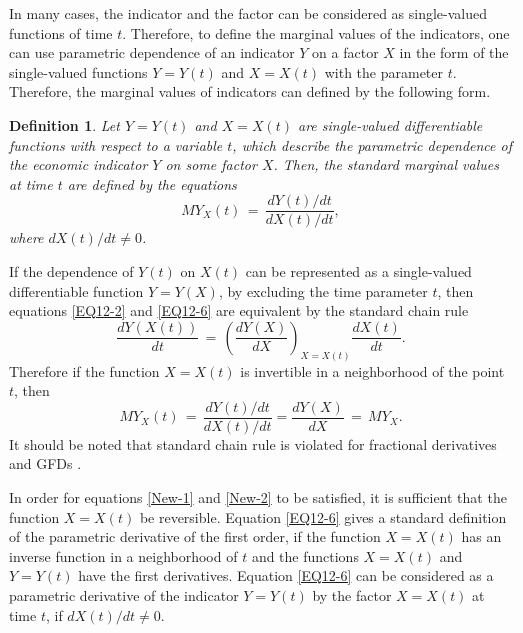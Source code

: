\documentclass[12pt]{article}
\newtheorem{Definition}{Definition}
\begin{document}
In many cases, the indicator and the factor can be considered as single-valued functions of time $t$. 
Therefore, to define the marginal values of the indicators, one can use parametric dependence of an indicator $Y$ on a factor $X$ in the form of the single-valued functions $Y=Y(t)$ and $X=X(t)$ with the parameter $t$.
Therefore, the marginal values of indicators can defined by the following form.

\begin{Definition}
Let $Y=Y(t)$ and $X=X(t)$ are single-valued differentiable functions with respect to a variable $t$, which describe the parametric dependence of the economic indicator $Y$ on some factor $X$. 
Then, the standard marginal values at time $t$ 
are defined by the equations 
\begin{equation} \label{EQ12-6} 
{MY}_X (t) \, = \, \frac{dY(t)/dt}{dX(t)/dt}, 
\end{equation} 
where $dX(t)/dt \ne 0$. 
\end{Definition}

If the dependence of $Y(t)$ on $X(t)$ can be represented as a single-valued differentiable function $Y=Y(X)$, by excluding the time parameter $t$, then equations \eqref{EQ12-2} and \eqref{EQ12-6} are equivalent by the standard chain rule
\begin{equation} \label{New-1}
\frac{dY(X(t))}{dt} \, = \, 
\left(\frac{dY(X)}{dX}\right)_{X=X(t)} \frac{dX(t)}{dt} .
\end{equation} 
Therefore if the function $X=X(t)$ is invertible in a neighborhood of the point $t$, then
\begin{equation} \label{New-2}
{MY}_X(t) \, = \, \frac{dY(t)/dt}{dX(t)/dt}=
\frac{dY(X)}{dX} \, = \, {MY}_X . 
\end{equation} 
It should be noted that standard chain rule is violated for fractional derivatives and GFDs 
\cite{CNSNS2016,Cresson2020,Math2019}.


In order for equations \eqref{New-1} and \eqref{New-2} to be satisfied, it is sufficient that the function $X = X(t)$ be reversible.
Equation \eqref{EQ12-6} gives a standard definition of the parametric derivative of the first order, 
if the function $X=X(t)$ has an inverse function in a neighborhood of $t$ and the functions $X=X(t)$ and $Y=Y(t)$ have the first derivatives. 
Equation \eqref{EQ12-6} can be considered as a parametric derivative of the indicator $Y = Y(t)$ by the factor $X = X(t)$ at time $t$, if $dX (t)/dt \ne 0$. 
\end{document}
